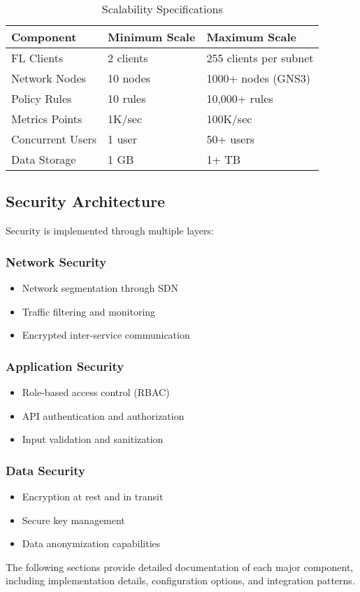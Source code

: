 \begin{table}[H]
\centering
\caption{Scalability Specifications}
\label{tab:scalability-specs}
\begin{tabular}{@{}lll@{}}
\toprule
\textbf{Component} & \textbf{Minimum Scale} & \textbf{Maximum Scale} \\
\midrule
FL Clients & 2 clients & 255 clients per subnet \\
Network Nodes & 10 nodes & 1000+ nodes (GNS3) \\
Policy Rules & 10 rules & 10,000+ rules \\
Metrics Points & 1K/sec & 100K/sec \\
Concurrent Users & 1 user & 50+ users \\
Data Storage & 1 GB & 1+ TB \\
\bottomrule
\end{tabular}
\end{table}

\subsection{Security Architecture}

Security is implemented through multiple layers:

\subsubsection{Network Security}
\begin{itemize}
    \item Network segmentation through SDN
    \item Traffic filtering and monitoring
    \item Encrypted inter-service communication
\end{itemize}

\subsubsection{Application Security}
\begin{itemize}
    \item Role-based access control (RBAC)
    \item API authentication and authorization
    \item Input validation and sanitization
\end{itemize}

\subsubsection{Data Security}
\begin{itemize}
    \item Encryption at rest and in transit
    \item Secure key management
    \item Data anonymization capabilities
\end{itemize}

The following sections provide detailed documentation of each major component, including implementation details, configuration options, and integration patterns.
